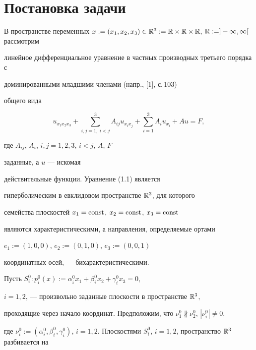 \section{Постановка задачи}





В пространстве переменных $x:=(x_1,x_2,x_3)\in \Bbb{R}^3:=\Bbb{R}


\times \Bbb{R} \times \Bbb{R}$, $\Bbb{R}:=]-\infty,\infty[$ рассмотрим


линейное дифференциальное уравнение в частных производных третьего порядка с


доминированными младшими членами (напр., [1], с.\,103)


общего вида




\begin{equation}


u_{x_1x_2x_3}+\sum_{i,j=1,\;i<j}^3


A_{ij}u_{x_ix_j}+\sum_{i=1}^3 A_{i}u_{x_i}+Au=F,


\end{equation}


где $A_{ij}$, $A_i$, $i,j=1,2,3$, $i<j$, $A$, $F$ --- 


заданные, а $u$ --- искомая


действительные функции. Уравнение (1.1) является 


гиперболическим в евклидовом пространстве $\Bbb{R}^3$, для которого 


семейства плоскостей $x_1=\operatorname{const}$, $x_2=\operatorname{const}$, $x_3=\operatorname{const}$


являются характеристическими, а направления, определяемые ортами


$e_1:=(1,0,0)$, $e_2:=(0,1,0)$, $e_3:=(0,0,1)$


координатных осей, --- бихарактеристическими.





Пусть $S_i^0:p_i^0(x):={\alpha}_i^0 x_1+{\beta}_i^0 x_2+{\gamma}_i^0 x_3=0$,


$i=1,2$, --- произвольно заданные плоскости в пространстве $\Bbb{R}^3$,


проходящие через начало координат. Предположим, что $\nu_1^0 \nparallel


\nu_2^0$, $|\nu_i^0|\neq 0$,


где $\nu_i^0:=(\alpha_i^0,\beta_i^0,\gamma_i^0)$, $i


=1,2$. Плоскостями $S_i^0$, $i=1,2$, пространство $\Bbb{R}^3$ разбивается на


